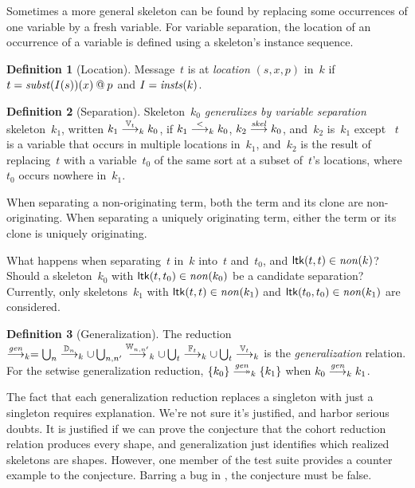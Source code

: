 \documentclass[12pt]{article}
\theoremstyle{definition}
\newtheorem{defn}{Definition}[section]
\newenvironment{note}{\itshape\par\noindent}{}
\begin{document}
Sometimes a more general skeleton can be found by replacing some
occurrences of one variable by a fresh variable.  For variable
separation, the location of an occurrence of a variable is defined
using a skeleton's instance sequence.

\begin{defn}[Location]
Message~$t$ is at \emph{location} $(s,x,p)$ in~$k$ if
$t=\operatorname{\mathit{subst}}(I(s))(x)\mathbin{@} p$ and $I=\operatorname{\mathit{insts}}(k)$.
\end{defn}

\begin{defn}[Separation]
Skeleton~$k_0$ \emph{generalizes by variable separation}
skeleton~$k_1$, written $k_1\stackrel{\mathbb V_t}{\longrightarrow}_k k_0$, if
$k_1\stackrel{<}{\longrightarrow}_k k_0$, $k_2\stackrel{\operatorname{\mathit{skel}}}{\longrightarrow}k_0$, and~$k_2$
is~$k_1$ except ~$t$ is a variable that occurs in multiple locations
in~$k_1$, and~$k_2$ is the result of replacing~$t$ with a variable~$t_0$
of the same sort at a subset of~$t$'s locations, where~$t_0$ occurs
nowhere in~$k_1$.
\end{defn}

When separating a non-originating term, both the term and its clone
are non-originating.  When separating a uniquely originating term,
either the term or its clone is uniquely originating.

\begin{note}
What happens when separating~$t$ in~$k$ into~$t$ and~$t_0$, and
$\operatorname{\mathsf{ltk}}(t,t)\in\operatorname{\mathit{non}}(k)$?  Should a skeleton~$k_0$ with
$\operatorname{\mathsf{ltk}}(t,t_0)\in\operatorname{\mathit{non}}(k_0)$ be a candidate separation?
Currently, only skeletons~$k_1$ with $\operatorname{\mathsf{ltk}}(t,t)\in\operatorname{\mathit{non}}(k_1)$
and $\operatorname{\mathsf{ltk}}(t_0,t_0)\in\operatorname{\mathit{non}}(k_1)$ are considered.
\end{note}

\begin{defn}[Generalization]
The reduction~$\stackrel{\operatorname{\mathit{gen}}}{\longrightarrow}_k
=\bigcup_n\stackrel{\mathbb D_n}{\longrightarrow}_k\cup
\bigcup_{n,n'}\stackrel{\mathbb W_{n,n'}}{\longrightarrow}_k\cup
\bigcup_t\stackrel{\mathbb F_t}{\longrightarrow}_k\cup \bigcup_t\stackrel{\mathbb V_t}{\longrightarrow}_k$
is the \emph{generalization} relation.  For the setwise generalization
reduction, $\{k_0\}\setreduction{\fn{gen}}_k\{k_1\}$ when
$k_0\stackrel{\operatorname{\mathit{gen}}}{\longrightarrow}_k k_1$.
\end{defn}

\begin{note}
The fact that each generalization reduction replaces a singleton with
just a singleton requires explanation.  We're not sure it's justified,
and harbor serious doubts.  It is justified if we can prove the
conjecture that the cohort reduction relation produces every shape,
and generalization just identifies which realized skeletons are
shapes.  However, one member of the test suite provides a counter
example to the conjecture.  Barring a bug in {\cpsa}, the conjecture
must be false.
\end{note}
\end{document}

